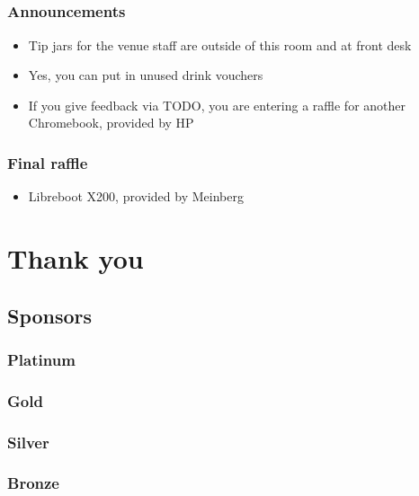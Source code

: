 \documentclass[t]{beamer}
\begin{document}
\subsection{}

\begin{frame}
	\frametitle{Announcements}
	\begin{itemize}
		\item Tip jars for the venue staff are outside of this room and at front desk
		\item Yes, you can put in unused drink vouchers %
		\item If you give feedback via TODO, you are entering a raffle for another Chromebook, provided by HP
	\end{itemize}
\end{frame}

\begin{frame}
	\frametitle{Final raffle}
	\begin{itemize}
		\item Libreboot X200, provided by Meinberg
	\end{itemize}
\end{frame}


\section{Thank you}

\subsection{Sponsors}

\begin{frame}
	\frametitle{Platinum}
\end{frame}

\begin{frame}
	\frametitle{Gold}
\end{frame}

\begin{frame}
	\frametitle{Silver}
\end{frame}

\begin{frame}
	\frametitle{Bronze}
\end{frame}
\end{document}
